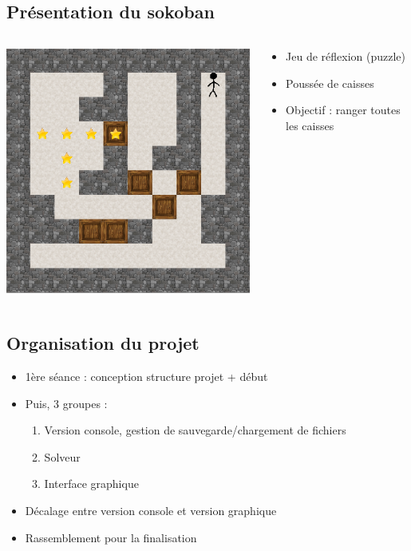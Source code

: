 \documentclass{beamer}
\begin{document}
\subsection{Présentation du sokoban}
\begin{frame} %
\begin{columns}
\hspace{0.5cm}
\begin{column}{5cm}
\includegraphics[scale=0.3]{images/sokoban.png}
\end{column}
\begin{column}{6cm}
\begin{itemize}
\item Jeu de réflexion (puzzle)
\item Poussée de caisses
\item Objectif : ranger toutes les caisses 
\end{itemize}
\end{column}
\end{columns}
\end{frame}

\subsection{Organisation du projet}
\begin{frame}
\begin{itemize}
\item 1ère séance : conception structure projet + début
\item Puis, 3 groupes :
\begin{enumerate}
\item Version console, gestion de sauvegarde/chargement de fichiers
\item Solveur
\item Interface graphique
\end{enumerate}
\item Décalage entre version console et version graphique
\item Rassemblement pour la finalisation
\end{itemize}
\end{frame}
\end{document}

